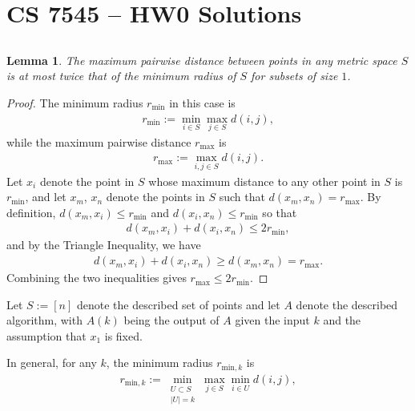 \documentclass[a4paper,12pt]{article}
\newtheorem{lem}[thm]{Lemma}
\theoremstyle{remark}
\begin{document}
\section*{CS 7545 -- HW0 Solutions}

\subsection{}
\begin{lem} \label{lem:max-pairwise}
    The maximum pairwise distance between points in any metric space $S$ is at most twice that of the minimum radius of $S$ for subsets of size $1$.
\end{lem}
\begin{proof}
    The minimum radius $r_{\text{min}}$ in this case is
    \begin{align*}
        r_{\text{min}} := \min_{i \in S} \max_{j \in S} d(i, j),
    \end{align*}
    while the maximum pairwise distance $r_{\text{max}}$ is
    \begin{align*}
        r_{\text{max}} := \max_{i, j \in S} d(i, j).
    \end{align*}
    Let $x_i$ denote the point in $S$ whose maximum distance to any other point in $S$ is $r_{\text{min}}$, and let $x_m$, $x_n$ denote the points in $S$ such that $d(x_m, x_n) = r_{\text{max}}$. By definition, $d(x_m, x_i) \leq r_{\text{min}}$ and $d(x_i, x_n) \leq r_{\text{min}}$ so that
    \begin{align*}
        d(x_m, x_i) + d(x_i, x_n) \leq 2r_{\text{min}},
    \end{align*}
    and by the Triangle Inequality, we have
    \begin{align*}
        d(x_m, x_i) + d(x_i, x_n) \geq d(x_m, x_n) = r_{\text{max}}.
    \end{align*}
    Combining the two inequalities gives $r_{\text{max}} \leq 2r_{\text{min}}$.
\end{proof}
Let $S := [n]$ denote the described set of points and let $A$ denote the described algorithm, with $A(k)$ being the output of $A$ given the input $k$ and the assumption that $x_1$ is fixed. \par
In general, for any $k$, the minimum radius $r_{\text{min}, k}$ is
\begin{align*}
    r_{\text{min}, k} := \min_{\substack{U \subset S \\ |U| = k}} \max_{j \in S} \min_{i \in U} d(i, j),
\end{align*}
\end{document}
